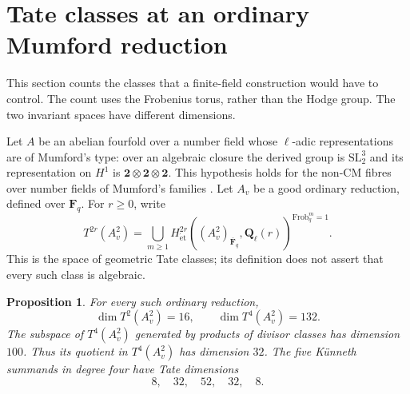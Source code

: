 \documentclass[11pt]{article}
\newtheorem{proposition}[theorem]{Proposition}
\theoremstyle{definition}
\theoremstyle{remark}
\begin{document}
\section{Tate classes at an ordinary Mumford reduction}
\label{sec:mumford-ordinary}

This section counts the classes that a finite-field construction would have
to control.  The count uses the Frobenius torus, rather than the Hodge group.
The two invariant spaces have different dimensions.

Let $A$ be an abelian fourfold over a number field whose $\ell$-adic
representations are of Mumford's type: over an algebraic closure the derived
group is $\mathrm{SL}_2^3$ and its representation on $H^1$ is
$\mathbf2\otimes\mathbf2\otimes\mathbf2$.  This hypothesis holds for
the non-CM fibres over number fields of Mumford's families
\cite[\S1.2, p.~4]{NootMumfordGalois}.
Let $A_v$ be a good ordinary reduction, defined over $\mathbf F_q$.
For $r\geq0$, write
\[
 T^{2r}(A_v^2)=
 \bigcup_{m\geq1}
 H^{2r}_{\mathrm{\acute et}}
 ((A_v^2)_{\overline{\mathbf F}_q},\mathbf Q_\ell(r))^{\mathrm{Frob}_q^m=1}.
\]
This is the space of geometric Tate classes; its definition does not assert
that every such class is algebraic.

\begin{proposition}\label{prop:mumford-ordinary-count}
For every such ordinary reduction,
\[
 \dim T^2(A_v^2)=16,\qquad \dim T^4(A_v^2)=132.
\]
The subspace of $T^4(A_v^2)$ generated by products of divisor classes
has dimension $100$.  Thus its quotient in $T^4(A_v^2)$ has dimension
$32$.  The five K\"unneth summands in degree four have Tate dimensions
\[
 8,\quad32,\quad52,\quad32,\quad8.
\]
\end{proposition}
\end{document}

